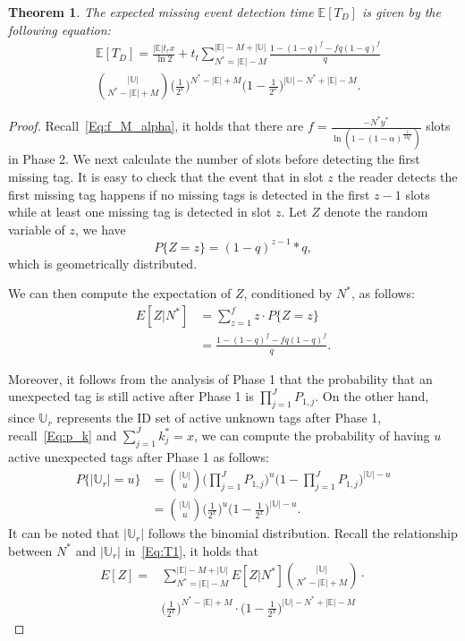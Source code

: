 \documentclass[10pt, twocolumn]{IEEEtran}
\newtheorem{theorem}{Theorem}
\begin{document}
\begin{theorem}
\label{Th:T_Z}
The expected missing event detection time $\mathbb{E}[T_D]$ is given by the following equation:
\begin{align}
\label{Eq:E[T_D]}
&\mathbb{E}[T_D]
= \frac{|\mathbb{E}| t_r x}{\ln 2} + t_t \sum_{N^*=|\mathbb{E}|-M}^{|\mathbb{E}|-M+|\mathbb{U}|}
    \frac{1-(1-q)^{f}-fq(1-q)^f}{q} \nonumber\\
         & \binom{|\mathbb{U}|}{N^*-|\mathbb{E}|+M}
          \Big(\frac{1}{2^{x}}\Big)^{N^*-|\mathbb{E}|+M} \Big(1-\frac{1}{2^{x}}\Big)^{|\mathbb{U}|-N^*+|\mathbb{E}|-M}.
\end{align}
\end{theorem}

\begin{proof}
Recall~\eqref{Eq:f_M_alpha}, it holds that there are  $f=\frac{-N^* y^*}{\ln (1- (1-\alpha)^{\frac{1}{M y^*}})}$ slots in Phase 2. We next calculate the number of slots before detecting the first missing tag.
It is easy to check that the event that in slot $z$ the reader detects the first missing tag happens if no missing tags is detected in the first $z-1$ slots while at least one missing tag is detected in slot $z$. Let $Z$ denote the random variable of $z$, we have
\begin{equation}
P\{Z=z\} = (1-q)^{z-1}*q,
\label{eq:z}
\end{equation}
which is geometrically distributed.

We can then compute the expectation of $Z$, conditioned by $N^*$, as follows:
\begin{align}
E[Z|N^*] &= \sum_{z=1}^{f} z \cdot P\{Z=z\}  \nonumber \\
&= \frac{1-(1-q)^{f}-fq(1-q)^f}{q}.
\label{eq:e_zn}
\end{align}

Moreover, it follows from the analysis of Phase 1 that the probability that an unexpected tag is still active after Phase 1 is $\prod_{j=1}^{J} {P_{1,j}}$.
On the other hand, since $\mathbb{U}_r$ represents the ID set of active unknown tags after Phase 1, recall~\eqref{Eq:p_k} and $\sum_{j=1}^{J} k^*_j =x$, we can compute the probability of having $u$ active unexpected tags after Phase 1 as follows:
\begin{align}
P\{|\mathbb{U}_r| = u\}
&= \binom{|\mathbb{U}|}{u} \Big(\prod_{j=1}^{J} {P_{1,j}}\Big)^u \Big(1-\prod_{j=1}^{J}
     {P_{1,j}}\Big)^{|\mathbb{U}|-u} \nonumber\\
&= \binom{|\mathbb{U}|}{u} \Big(\frac{1}{2^{x}}\Big)^{u} \Big(1-\frac{1}{2^{x}}\Big)^{|\mathbb{U}|-u}.
\end{align}
It can be noted that $|\mathbb{U}_r|$ follows the binomial distribution.
Recall the relationship between $N^*$ and $|\mathbb{U}_r|$ in~\eqref{Eq:T1}, it holds that
\begin{align}
E[Z] =& \sum_{N^*=|\mathbb{E}|-M}^{|\mathbb{E}|-M+|\mathbb{U}|} E[Z|N^*]
         \binom{|\mathbb{U}|}{N^*-|\mathbb{E}|+M} \cdot \nonumber\\
      &    \Big(\frac{1}{2^{x}}\Big)^{N^*-|\mathbb{E}|+M}
    \cdot \Big(1-\frac{1}{2^{x}}\Big)^{|\mathbb{U}|-N^*+|\mathbb{E}|-M}
    \label{eq:e_z}
\end{align}


\end{proof}
\end{document}
